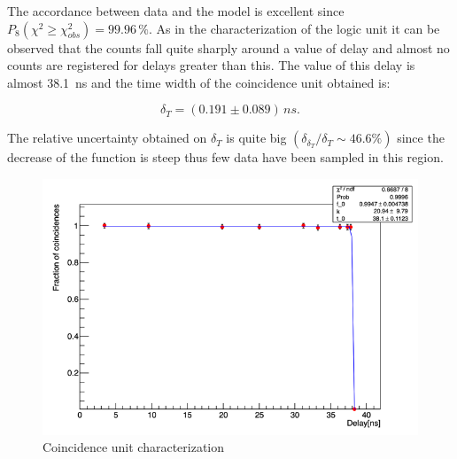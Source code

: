\documentclass[a4paper, 12pt]{report}
\begin{document}
The accordance between data and the model is excellent since $P_8\left(\chi^2\geq\chi_{obs}^2\right)=99.96\,\%$.
As in the  characterization of the logic unit it can be observed that  the counts fall quite sharply around a value of  delay and almost no counts are registered for delays greater than this.  
The value of this delay is almost \SI{38.1}{ns} and the time width of the coincidence unit obtained is: 

\begin{equation}
\delta_T = ( 0.191\pm 0.089 ) \, \si{ns}.
\end{equation}

The relative uncertainty obtained on $\delta_T$ is quite big $\left( \delta_{\delta_T} / \delta_T \sim 46.6 \%\right)$ since the decrease of the function is steep thus few data have been sampled in this region.   \\

\begin{figure}[!h]
	\centering
	\includegraphics[width=\linewidth]{coinc_plot.png}
	\caption{Coincidence unit characterization}
	\label{coinc_plot}
\end{figure}
\end{document}
